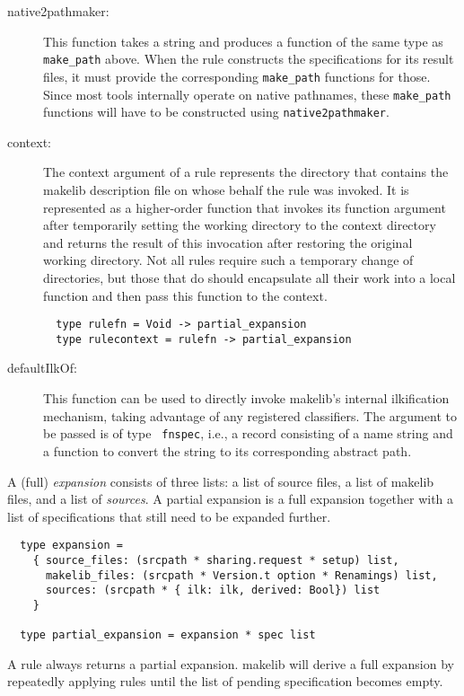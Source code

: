 \begin{description}
\item[native2pathmaker:] This function takes a string and produces a
function of the same type as {\tt make_path} above.  When the rule
constructs the specifications for its result files, it must provide
the corresponding {\tt make_path} functions for those.  Since most tools
internally operate on native pathnames, these {\tt make_path} functions
will have to be constructed using {\tt native2pathmaker}.
\item[context:] The context argument of a rule represents the
directory that contains the makelib description file on whose behalf the
rule was invoked.  It is represented as a higher-order function that
invokes its function argument after temporarily setting the working
directory to the context directory and returns the result of this
invocation after restoring the original working directory.  Not all
rules require such a temporary change of directories, but those that
do should encapsulate all their work into a local function and then
pass this function to the context.
\begin{verbatim}
  type rulefn = Void -> partial_expansion
  type rulecontext = rulefn -> partial_expansion
\end{verbatim}
\item[defaultIlkOf:] This function can be used to directly invoke
makelib's internal ilkification mechanism, taking advantage of any
registered classifiers.  The argument to be passed is of type {\tt
fnspec}, i.e., a record consisting of a name string and a function to
convert the string to its corresponding abstract path.
\end{description}

A (full) {\em expansion} consists of three lists: a list of source files,
a list of makelib files, and a list of {\em sources}.  A partial expansion
is a full expansion together with a list of specifications that still
need to be expanded further.

\begin{verbatim}
  type expansion =
    { source_files: (srcpath * sharing.request * setup) list,
      makelib_files: (srcpath * Version.t option * Renamings) list,
      sources: (srcpath * { ilk: ilk, derived: Bool}) list
    }

  type partial_expansion = expansion * spec list
\end{verbatim}

A rule always returns a partial expansion.  makelib will derive a full
expansion by repeatedly applying rules until the list of pending
specification becomes empty.

